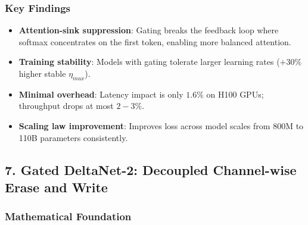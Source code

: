 \documentclass[11pt,a4paper]{article}
\begin{document}
\subsubsection{Key Findings}

\begin{itemize}[leftmargin=*]
    \item \textbf{Attention-sink suppression}: Gating breaks the feedback loop where softmax concentrates on the first token, enabling more balanced attention.
    \item \textbf{Training stability}: Models with gating tolerate larger learning rates ($+30\%$ higher stable $\eta_{max}$).
    \item \textbf{Minimal overhead}: Latency impact is only $1.6\%$ on H100 GPUs; throughput drops at most $2-3\%$.
    \item \textbf{Scaling law improvement}: Improves loss across model scales from 800M to 110B parameters consistently.
\end{itemize}

\normalsize

\subsection{7. Gated DeltaNet-2: Decoupled Channel-wise Erase and Write}

\subsubsection{Mathematical Foundation}
\end{document}
